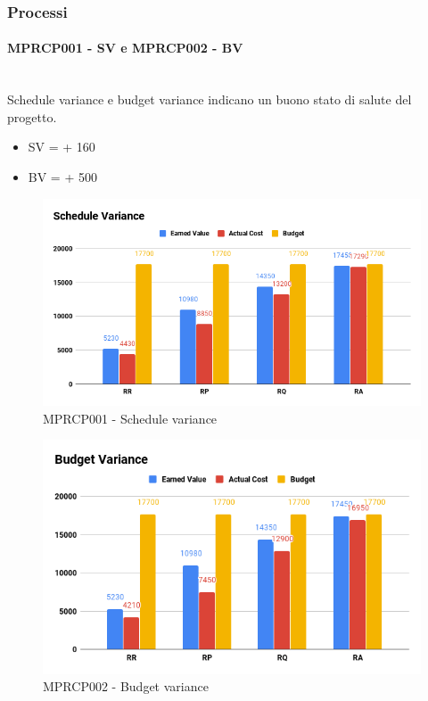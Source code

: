 \subsubsection{Processi}
\paragraph{MPRCP001 - SV e MPRCP002 -  BV}\mbox{}\\[0.4cm]
Schedule variance e budget variance indicano un buono stato di salute del progetto.
\begin{itemize}
	\item SV = + 160
	\item BV = + 500
\end{itemize}
\begin{figure}[H]
	\centering
	\includegraphics[width=13cm,keepaspectratio]{../includes/pics/Schedule_VarianceRA.png}
	\caption{\label{fig:mission}MPRCP001 - Schedule variance}
\end{figure}
\begin{figure}[H]
	\centering
	\includegraphics[width=13cm,keepaspectratio]{../includes/pics/Budget_VarianceRA.png}
	\caption{\label{fig:mission}MPRCP002 - Budget variance}
\end{figure}
